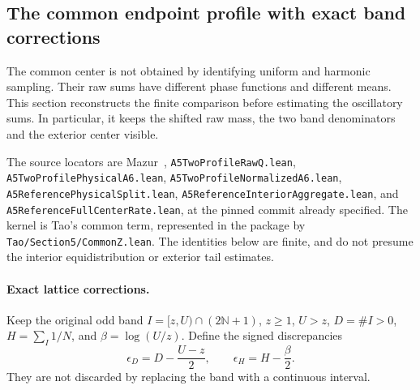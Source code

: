 \subsection{The common endpoint profile with exact band corrections}
\label{sec:Mazur-common-profile}

The common center is not obtained by identifying uniform and harmonic
sampling. Their raw sums have different phase functions and different
means. This section reconstructs the finite comparison before estimating
the oscillatory sums. In particular, it keeps the shifted raw mass,
the two band denominators and the exterior center visible.

The source locators are Mazur~\cite{Mazur2026v2},
\texttt{A5TwoProfileRawQ.lean}, \texttt{A5TwoProfilePhysicalA6.lean},
\texttt{A5TwoProfileNormalizedA6.lean},
\texttt{A5ReferencePhysicalSplit.lean},
\texttt{A5ReferenceInteriorAggregate.lean}, and
\texttt{A5ReferenceFullCenterRate.lean}, at the pinned commit already
specified. The kernel is Tao's common term, represented in the package
by \texttt{Tao/Section5/CommonZ.lean}. The identities below are finite,
and do not presume the interior equidistribution or exterior tail estimates.

\paragraph{Exact lattice corrections.}
Keep the original odd band $I=[z,U)\cap(2\mathbb N+1)$,
$z\ge1$, $U>z$, $D=\#I>0$, $H=\sum_I1/N$,
and $\beta=\log(U/z)$. Define the signed discrepancies
\[
 \epsilon_D=D-\frac{U-z}{2},\qquad
 \epsilon_H=H-\frac{\beta}{2}.
\]
They are not discarded by replacing the band with a continuous interval.

